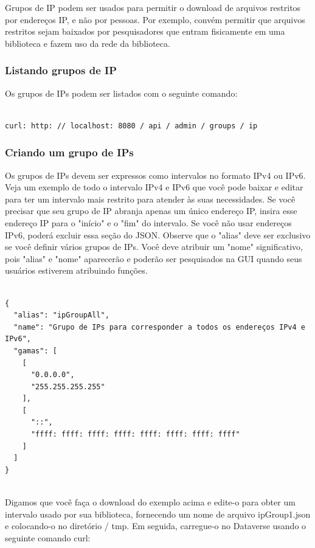 \documentclass[12pt,hidelinks]{article}
\begin{document}
\qquad Grupos de IP podem ser usados para permitir o download de arquivos restritos por endereços IP, e não por pessoas. Por exemplo, convém permitir que arquivos restritos sejam baixados por pesquisadores que entram fisicamente em uma biblioteca e fazem uso da rede da biblioteca.

\subsubsection{Listando grupos de IP}

\qquad Os grupos de IPs podem ser listados com o seguinte comando:

\begin{verbatim}

curl: http: // localhost: 8080 / api / admin / groups / ip

\end{verbatim}

\subsubsection{Criando um grupo de IPs}

\qquad Os grupos de IPs devem ser expressos como intervalos no formato IPv4 ou IPv6. Veja um exemplo de todo o intervalo IPv4 e IPv6 que você pode baixar e editar para ter um intervalo mais restrito para atender às suas necessidades. Se você precisar que seu grupo de IP abranja apenas um único endereço IP, insira esse endereço IP para o "início" e o "fim" do intervalo. Se você não usar endereços IPv6, poderá excluir essa seção do JSON. Observe que o "alias" deve ser exclusivo se você definir vários grupos de IPs. Você deve atribuir um "nome" significativo, pois "alias" e "nome" aparecerão e poderão ser pesquisados na GUI quando seus usuários estiverem atribuindo funções.

\begin{verbatim}

{
  "alias": "ipGroupAll",
  "name": "Grupo de IPs para corresponder a todos os endereços IPv4 e IPv6",
  "gamas": [
    [
      "0.0.0.0",
      "255.255.255.255"
    ],
    [
      "::",
      "ffff: ffff: ffff: ffff: ffff: ffff: ffff: ffff"
    ]
  ]
}
 
\end{verbatim}
 
Digamos que você faça o download do exemplo acima e edite-o para obter um intervalo usado por sua biblioteca, fornecendo um nome de arquivo ipGroup1.json e colocando-o no diretório / tmp. Em seguida, carregue-o no Dataverse usando o seguinte comando curl:
\end{document}
